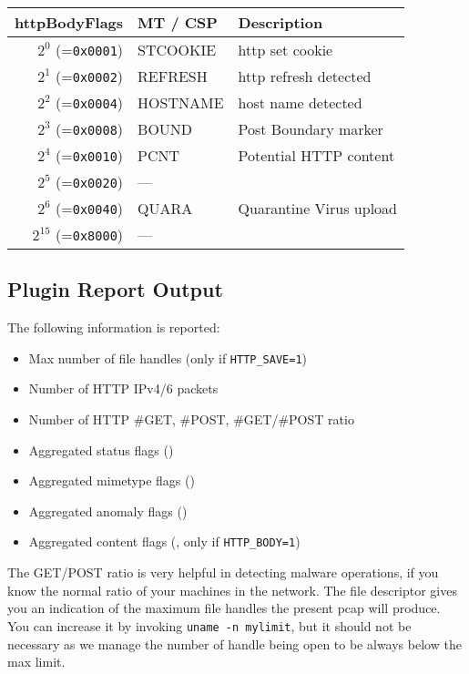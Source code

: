 \documentclass[documentation]{subfiles}
\begin{document}
\begin{longtable}{rll}
    \toprule
    {\bf httpBodyFlags} & {\bf MT / CSP} & {\bf Description}\\
    \midrule\endhead%
    $2^{0}$  (={\tt 0x0001}) & STCOOKIE & http set cookie\\
    $2^{1}$  (={\tt 0x0002}) & REFRESH & http refresh detected\\
    $2^{2}$  (={\tt 0x0004}) & HOSTNAME & host name detected\\
    $2^{3}$  (={\tt 0x0008}) & BOUND & Post Boundary marker\\
    $2^{4}$  (={\tt 0x0010}) & PCNT & Potential HTTP content\\
    $2^{5}$  (={\tt 0x0020}) & --- &\\
    $2^{6}$  (={\tt 0x0040}) & QUARA & Quarantine Virus upload\\
    $2^{15}$ (={\tt 0x8000}) & --- & \\
    \bottomrule
\end{longtable}

\subsection{Plugin Report Output}
The following information is reported:
\begin{itemize}
    \item Max number of file handles (only if {\tt HTTP\_SAVE=1})
    \item Number of HTTP IPv4/6 packets
    \item Number of HTTP \#GET, \#POST, \#GET/\#POST ratio
    \item Aggregated status flags ({\tt{}})
    \item Aggregated mimetype flags ({\tt{}})
    \item Aggregated anomaly flags ({\tt{}})
    \item Aggregated content flags ({\tt{}}, only if {\tt HTTP\_BODY=1})
\end{itemize}

The GET/POST ratio is very helpful in detecting malware operations, if you know the normal ratio of your
machines in the network. The file descriptor gives you an indication of the maximum file handles the
present pcap will produce. You can increase it by invoking {\tt uname -n mylimit}, but it should not
be necessary as we manage the number of handle being open to be always below the max limit.



%
\end{document}
